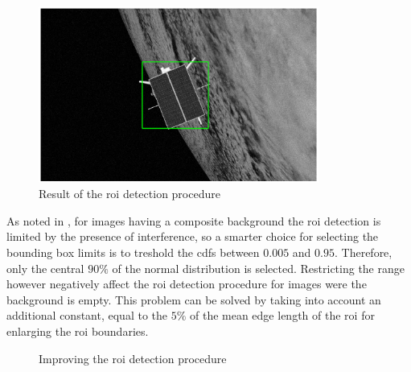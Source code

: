 \begin{figure}[htbp]
  \centering
  \includegraphics[width=0.82\textwidth]{gfx/FeatureDetection/ROI.eps}
  \caption{Result of the \acrshort{roi} detection procedure}
  \label{fig:ROI}
\end{figure}

As noted in \cite{fracchio2019}, for images having a composite background the \acrshort{roi} detection is limited by the presence of interference, so a smarter choice for selecting the bounding box limits is to treshold the \acrshort{cdf}s between $0.005$ and $0.95$. Therefore, only the central $90\%$ of the normal distribution is selected. Restricting the range however negatively affect the \acrshort{roi} detection procedure for images were the background is empty. This problem can be solved by taking into account an additional constant, equal to the $5\%$ of the mean edge length of the \acrshort{roi} for enlarging the \acrshort{roi} boundaries.

\begin{figure}[htbp]
  \centering
  \qquad
  \caption{Improving the \acrshort{roi} detection procedure}
  \label{fig:roicomparisons}
\end{figure}

